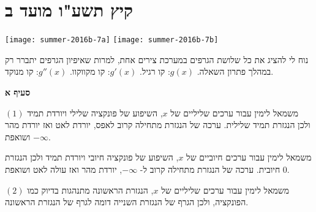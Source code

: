 \np




\section{קיץ תשע"ו מועד ב}

\begin{center}
\texttt{[image: summer-2016b-7a]}
\texttt{[image: summer-2016b-7b]}
\end{center}

\vspace{-1ex}

נוח לי להציג את כל שלושת הגרפים במערכת צירים אחת, למרות שאיפיון הגרפים יתברר רק במהלך פתרון השאלה. 
$g(x)$:
קו רגיל.
$g'(x)$:
קו מקווקוו.
$g''(x)$:
קו מנוקד.

\begin{center}
\end{center}

\np

\textbf{סעיף א}

$(1)$
משמאל לימין עבור ערכים שליליים של 
$x$,
השיפוע של פונקציה שלילי ויורדת תמיד ולכן הנגזרת תמיד שלילית. ערכה של הנגזרת מתחילה קרוב לאפס, יורדת לאט ואז יורדת מהר ושואפת 
$-\infty$.

משמאל לימין עבור ערכים חיוביים של 
$x$,
השיפוע של פונקציה חיובי ויורדת תמיד ולכן הנגזרת חיובית. ערכה של הנגזרת מתחילה קרוב ל-%
$-\infty$,
יורדת מהר ואז עולה לאט ושואפת 
$0$.


$(2)$
משמאל לימין עבור ערכים שליליים של 
$x$,
הנגזרת הראשונה מתנהגות בדיוק כמו הפונקציה, ולכן הגרף של הנגזרת השנייה דומה לגרף של הנגזרת הראשונה.

